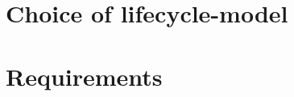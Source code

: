 \documentclass[12pt]{report}
\begin{document}

	

	

	


	


		
		

		

		

		

		

		

		

		

		

		

		

		




		

\chapter{Choice of lifecycle-model}

	

	

\chapter{Requirements}
	
\end{document}
